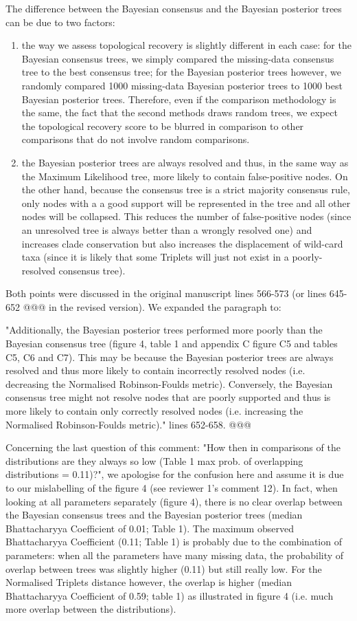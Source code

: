 \documentclass[12pt,letterpaper]{article}
\begin{document}
\begin{enumerate}
The difference between the Bayesian consensus and the Bayesian posterior trees can be due to two factors:
\begin{enumerate}[I]
\item the way we assess topological recovery is slightly different in each case: for the Bayesian consensus trees, we simply compared the missing-data consensus tree to the best consensus tree; for the Bayesian posterior trees however, we randomly compared 1000 missing-data Bayesian posterior trees to 1000 best Bayesian posterior trees.
Therefore, even if the comparison methodology is the same, the fact that the second methods draws random trees, we expect the topological recovery score to be blurred in comparison to other comparisons that do not involve random comparisons.
\item the Bayesian posterior trees are always resolved and thus, in the same way as the Maximum Likelihood tree, more likely to contain false-positive nodes. On the other hand, because the consensus tree is a strict majority consensus rule, only nodes with a a good support will be represented in the tree and all other nodes will be collapsed. This reduces the number of false-positive nodes (since an unresolved tree is always better than a wrongly resolved one) and increases clade conservation but also increases the displacement of wild-card taxa (since it is likely that some Triplets will just not exist in a poorly-resolved consensus tree).
\end{enumerate}
Both points were discussed in the original manuscript lines 566-573 (or lines 645-652 @@@ in the revised version).
We expanded the paragraph to:

"Additionally, the Bayesian posterior trees performed more poorly than the Bayesian consensus tree (figure 4, table 1 and appendix C figure C5 and tables C5, C6 and C7).
This may be because the Bayesian posterior trees are always resolved and thus more likely to contain incorrectly resolved nodes (i.e. decreasing the Normalised Robinson-Foulds metric).
Conversely, the Bayesian consensus tree might not resolve nodes that are poorly supported and thus is more likely to contain only correctly resolved nodes (i.e. increasing the Normalised Robinson-Foulds metric)." lines 652-658. @@@

Concerning the last question of this comment: "How then in comparisons of the distributions are they always so low (Table 1 max prob. of overlapping distributions = 0.11)?", we apologise for the confusion here and assume it is due to our mislabelling of the figure 4 (see reviewer 1's comment 12).
In fact, when looking at all parameters separately (figure 4), there is no clear overlap between the Bayesian consensus trees and the Bayesian posterior trees (median Bhattacharyya Coefficient of 0.01; Table 1).
The maximum observed Bhattacharyya Coefficient (0.11; Table 1) is probably due to the combination of parameters: when all the parameters have many missing data, the probability of overlap between trees was slightly higher (0.11) but still really low.
For the Normalised Triplets distance however, the overlap is higher (median Bhattacharyya Coefficient of 0.59; table 1) as illustrated in figure 4 (i.e. much more overlap between the distributions).



\end{enumerate}
\end{document}
